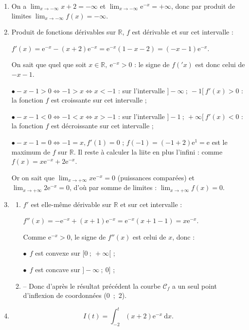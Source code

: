 \documentclass[10pt]{article}
\providecommand{\R}{\mathbb{R}}
\providecommand{\e}{{\mathrm{e}}}
\begin{document}
\begin{enumerate}
\item 
On a $\displaystyle\lim_{x \to -\infty} x + 2 = - \infty$ et $\displaystyle\lim_{x \to -\infty}
\e^{-x} = + \infty$, donc par produit de limites $\displaystyle\lim_{x \to -\infty}f(x) = - \infty$.

\item 
Produit de fonctions dérivables sur $\R$, $f$ est dérivable et sur cet intervalle :

$f'(x) = \e^{-x} - (x + 2)\e^{-x} = \e^{-x}(1 - x - 2) = (- x - 1)\e^{-x}$.

On sait que quel que soit $x \in \R, \: \e^{-x} > 0$ : le signe de $f('x)$ est donc celui de $- x - 1$.

$\bullet -x - 1 > 0 \iff - 1 > x \iff x < - 1$ : sur l'intervalle $]- \infty~;~-1[ \: f'(x) > 0$ : la fonction $f$ est croissante sur cet intervalle ;

$\bullet -x - 1 < 0 \iff - 1 < x \iff x > - 1$ : sur l'intervalle $]-1 ~;~+\infty[\: f'(x) < 0$ : la fonction $f$ est décroissante sur cet intervalle ;

$\bullet -x - 1 = 0 \iff - 1 = x, f'(1) = 0$ ; $f(-1) = (-1 + 2)\e^{1} = \e$ est le maximum de $f$ sur $\R$.
Il reste à calculer la liite en plus l'infini : comme $f(x) = x\e^{-x} + 2\e^{-x}$.

Or on sait que $\displaystyle\lim_{x \to + \infty} x\e^{-x} = 0$ (puissances comparées) et $\displaystyle\lim_{x \to + \infty} 2\e^{-x} = 0$, d'où par somme de limites :
$\displaystyle\lim_{x \to + \infty} f(x) = 0$.

\item 
	\begin{enumerate}
		\item 
$f'$ est elle-même dérivable sur $\R$ et sur cet intervalle :

$f''(x) = -\e^{-x} + (x + 1)\e^{-x} = \e^{-x}(x + 1 - 1) = x \e^{-x}$.

Comme $\e^{-x} > 0$, le signe de $f''(x)$ est celui de $x$, donc :

$\bullet~~$$f$ est convexe sur $[0~;~+ \infty[$ ;

$\bullet~~$$f$ est concave sur $]- \infty~;~0]$ ;
		\item 
-- Donc d'après le résultat précédent la courbe $\mathcal{C}_f$ a un seul point d'inflexion de coordonnées (0~;~2).
	\end{enumerate}
\item 
\[I(t) = \displaystyle\int_{-2}^t (x + 2)\e^{-x}\:\text{d}x.\]


\end{enumerate}
\end{document}
